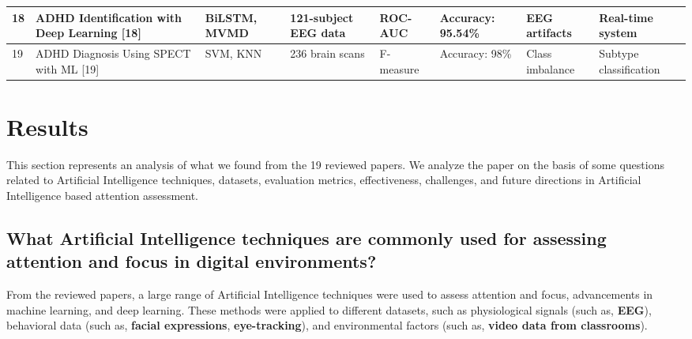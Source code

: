 \documentclass[twocolumn,12pt]{article}
\newcommand{\tablecell}[1]{\raggedright\footnotesize #1}
\begin{document}
{\begin{longtable}{|p{}|p{}|p{}|p{}|p{}|p{}|p{}|p{}|}
\hline
18 & \tablecell{ADHD Identification with Deep Learning [18]} & \tablecell{BiLSTM, MVMD} & \tablecell{121-subject EEG data} & \tablecell{ROC-AUC} & \tablecell{Accuracy: 95.54\%} & \tablecell{EEG artifacts} & \tablecell{Real-time system} \\
\hline
19 & \tablecell{ADHD Diagnosis Using SPECT with ML [19]} & \tablecell{SVM, KNN} & \tablecell{236 brain scans} & \tablecell{F-measure} & \tablecell{Accuracy: 98\%} & \tablecell{Class imbalance} & \tablecell{Subtype classification} \\
\hline
\end{longtable}
\twocolumn

\section{Results}
This section represents an analysis of what we found from the 19 reviewed papers. We analyze the paper on the basis of some questions related to Artificial Intelligence techniques, datasets, evaluation metrics, effectiveness, challenges, and future directions in Artificial Intelligence based attention assessment.

\subsection{What Artificial Intelligence techniques are commonly used for assessing attention and focus in digital environments?}
From the reviewed papers, a large range of Artificial Intelligence techniques were used to assess attention and focus, advancements in machine learning, and deep learning. These methods were applied to different datasets, such as physiological signals (such as, \textbf{EEG}), behavioral data (such as, \textbf{facial expressions}, \textbf{eye-tracking}), and environmental factors (such as, \textbf{video data from classrooms}).

}
\end{document}
